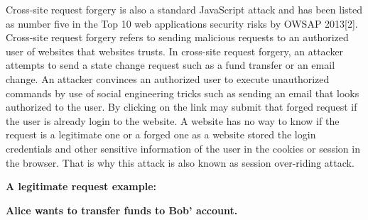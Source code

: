 Cross-site request forgery is also a standard JavaScript attack and has been listed as number five in the Top 10 web applications security risks by OWSAP 2013[2]. Cross-site request forgery refers to sending malicious requests to an authorized user of websites that websites trusts. In cross-site request forgery, an attacker attempts to send a state change request such as a fund transfer or an email change. An attacker convinces an authorized user to execute unauthorized commands by use of social engineering tricks such as sending an email that looks authorized to the user. By clicking on the link may submit that forged request if the user is already login to the website. A website has no way to know if the request is a legitimate one or a forged one as a website stored the login credentials and other sensitive information of the user in the cookies or session in the browser. That is why this attack is also known as session over-riding attack.

{\bf A legitimate request example:}


{\bf Alice wants to transfer funds to Bob' account.}

\bigskip

